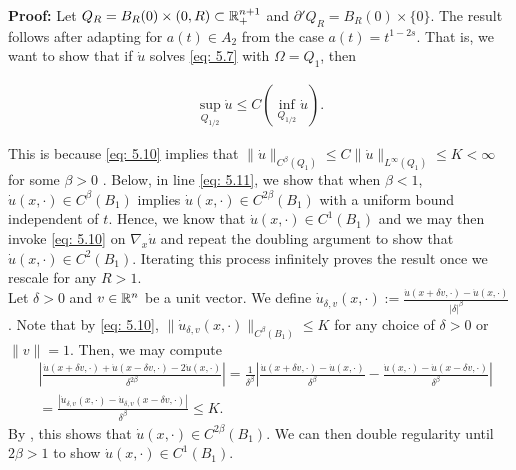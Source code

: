 \documentclass{article}
\begin{document}
\noindent
\textbf{Proof:} Let $Q_R = B_R(0) \times (0,R) \subset \mathbb{R}^{n+1}_+$ and $\partial' Q_R =  B_R(0) \times \{0\}$. The result follows after adapting \cite[Thm 1.2]{tan} for $a(t) \in A_2$ from the case $a(t)=t^{1-2s}$. That is, we want to show that if $\dot{u}$ solves \eqref{eq: 5.7} with $\Omega = Q_1$, then

\begin{align*}
\sup_{Q_{1/2}} \dot{u} \le C(\inf_{Q_{1/2}}\dot{u}).
\tag{5.10}\label{eq: 5.10}
\end{align*}

This is because \eqref{eq: 5.10} implies that $\|\dot{u}\|_{C^\beta(Q_1)}\le C\| \dot{u}\|_{L^\infty(Q_1)} \le K < \infty$ for some $\beta>0$ \cite[Thm 2.3.15]{fabes}. Below, in line \eqref{eq: 5.11}, we show that when $\beta<1$, $\dot{u}(x, \cdot) \in C^\beta(B_1)$ implies $\dot{u}(x, \cdot) \in C^{2\beta}(B_1)$ with a uniform bound independent of $t$. Hence, we know that $\dot{u}(x, \cdot) \in C^1(B_1)$ and we may then invoke \eqref{eq: 5.10} on $\nabla_x \dot{u}$ and repeat the doubling argument to show that $\dot{u}(x, \cdot) \in C^2(B_1)$. Iterating this process infinitely proves the result once we rescale for any $R>1$.\\

Let $\delta>0$ and $v \in \mathbb{R}^n$ be a unit vector. We define $\dot{u}_{\delta,v}(x, \cdot) := \frac{\dot{u}(x+\delta v, \cdot)-\dot{u}(x, \cdot) }{|\delta|^\beta}$. Note that by \eqref{eq: 5.10}, $\|\dot{u}_{\delta,v}(x, \cdot)\|_{C^\beta(B_1)} \le K$ for any choice of $\delta>0$ or $\|v\|=1$. Then, we may compute
\begin{align*}
   &\left|\frac{\dot{u}(x+\delta v, \cdot) + \dot{u}(x-\delta v, \cdot) - 2\dot{u}(x, \cdot) }{\delta^{2\beta}}\right| = \frac{1}{\delta^\beta} \left|\frac{\dot{u}(x+\delta v, \cdot)-\dot{u}(x, \cdot)}{\delta^\beta} - \frac{\dot{u}(x, \cdot)-\dot{u}(x-\delta v, \cdot)}{\delta^\beta}\right| \\
   &= \frac{\left|\dot{u}_{\delta, v}(x, \cdot) - \dot{u}_{\delta,v}(x-\delta v, \cdot) \right|}{\delta^\beta} \le K.
   \tag{5.11}\label{eq: 5.11}
\end{align*}
By \cite{stein}, this shows that $\dot{u}(x, \cdot) \in C^{2\beta}(B_1)$. We can then double regularity until $2\beta >1$ to show $\dot{u}(x, \cdot) \in C^1(B_1) $.\\
\end{document}
